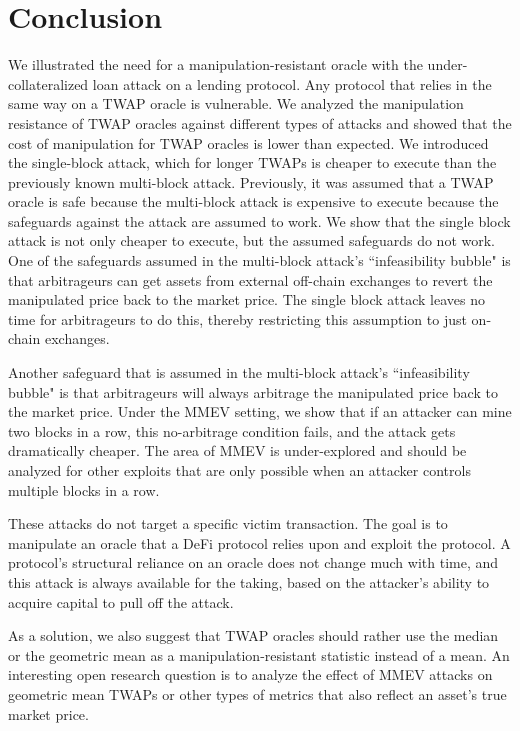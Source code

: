 \section{Conclusion}
We illustrated the need for a manipulation-resistant oracle with the under-collateralized loan attack on a lending protocol. Any protocol that relies in the same way on a TWAP oracle is vulnerable. We analyzed the manipulation resistance of TWAP oracles against different types of attacks and showed that the cost of manipulation for TWAP oracles is lower than expected. We introduced the single-block attack, which for longer TWAPs is cheaper to execute than the previously known multi-block attack. Previously, it was assumed that a TWAP oracle is safe because the multi-block attack is expensive to execute because the safeguards against the attack are assumed to work. We show that the single block attack is not only cheaper to execute, but the assumed safeguards do not work. One of the safeguards assumed in the multi-block attack's ``infeasibility bubble" is that arbitrageurs can get assets from external off-chain exchanges to revert the manipulated price back to the market price. The single block attack leaves no time for arbitrageurs to do this, thereby restricting this assumption to just on-chain exchanges.

Another safeguard that is assumed in the multi-block attack's ``infeasibility bubble" is that arbitrageurs will always arbitrage the manipulated price back to the market price. Under the MMEV setting, we show that if an attacker can mine two blocks in a row, this no-arbitrage condition fails, and the attack gets dramatically cheaper. The area of MMEV is under-explored and should be analyzed for other exploits that are only possible when an attacker controls multiple blocks in a row. 

These attacks do not target a specific victim transaction. The goal is to manipulate an oracle that a DeFi protocol relies upon and exploit the protocol. A protocol's structural reliance on an oracle does not change much with time, and this attack is always available for the taking, based on the attacker's ability to acquire capital to pull off the attack.

As a solution, we also suggest that TWAP oracles should rather use the median or the geometric mean as a manipulation-resistant statistic instead of a mean. An interesting open research question is to analyze the effect of MMEV attacks on geometric mean TWAPs or other types of metrics that also reflect an asset's true market price.

